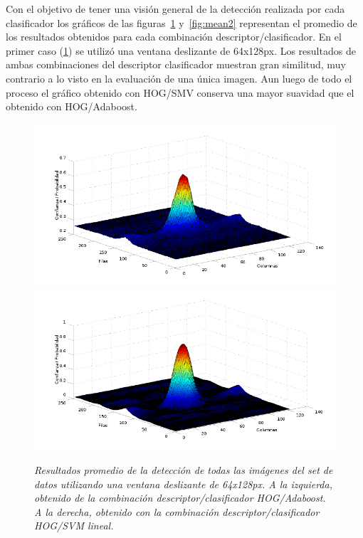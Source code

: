 Con el objetivo de tener una visión general de la detección realizada por cada clasificador los gráficos de las figuras~\ref{fig:mean1} y~\ref{fig:mean2} representan el promedio de los resultados obtenidos para cada combinación descriptor/clasificador.
En el primer caso (\ref{fig:mean1}) se utilizó una ventana deslizante de 64x128px. Los resultados de ambas combinaciones del descriptor clasificador muestran gran similitud, muy contrario a lo visto en la evaluación de una única imagen. Aun luego de todo el proceso el gráfico obtenido con HOG/SMV conserva una mayor suavidad que el obtenido con HOG/Adaboost. 

\begin{figure}[htc]
  \centering
  \includegraphics[scale=.25]{images/mean/boost/64}
  \includegraphics[scale=.25]{images/mean/svm/64}
  \caption{\em  Resultados promedio de la detección de todas las imágenes del set de datos utilizando una ventana deslizante de 64x128px. A la izquierda, obtenido de la combinación descriptor/clasificador HOG/Adaboost. A la derecha, obtenido con la combinación descriptor/clasificador HOG/SVM lineal.}  
  \label{fig:mean1}
\end{figure}

